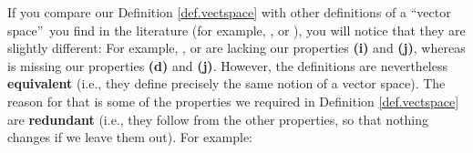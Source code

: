 \documentclass[numbers=enddot,12pt,final,onecolumn,notitlepage]{scrartcl}%
\theoremstyle{definition}
\begin{document}
If you compare our Definition \ref{def.vectspace} with other definitions of a
\textquotedblleft vector space\textquotedblright\ you find in the literature
(for example, \cite[Definition 4.1.1]{LaNaSc16}, \cite[Definition
2.1]{OlvSha06} or \cite[Definition Two.I.1]{Heffer16}), you will notice that
they are slightly different: For example, \cite[Definition 4.1.1]{LaNaSc16},
\cite[Definition 2.1]{OlvSha06} or \cite[Definition Two.I.1]{Heffer16} are
lacking our properties \textbf{(i)} and \textbf{(j)}, whereas \cite[Definition
2.3.1]{Kowals16} is missing our properties \textbf{(d)} and \textbf{(j)}.
However, the definitions are nevertheless \textbf{equivalent} (i.e., they
define precisely the same notion of a vector space). The reason for that is
some of the properties we required in Definition \ref{def.vectspace} are
\textbf{redundant} (i.e., they follow from the other properties, so that
nothing changes if we leave them out). For example:
\end{document}
